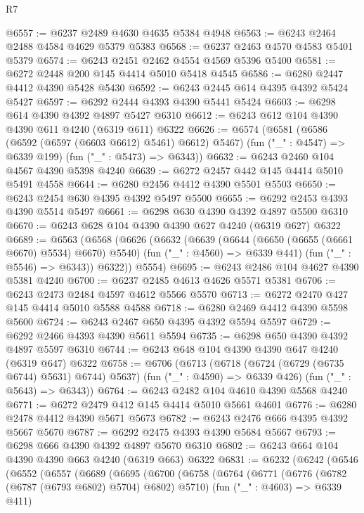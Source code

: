 \begin{lexlean}{R7}
\begin{coremodule}
@6557 := @6237 @2489 @4630 @4635 @5384 @4948
@6563 := @6243 @2464 @2488 @4584 @4629 @5379 @5383
@6568 := @6237 @2463 @4570 @4583 @5401 @5379
@6574 := @6243 @2451 @2462 @4554 @4569 @5396 @5400
@6581 := @6272 @2448 @200 @145 @4414 @5010 @5418 @4545
@6586 := @6280 @2447 @4412 @4390 @5428 @5430
@6592 := @6243 @2445 @614 @4395 @4392 @5424 @5427
@6597 := @6292 @2444 @4393 @4390 @5441 @5424
@6603 := @6298 @614 @4390 @4392 @4897 @5427 @6310
@6612 := @6243 @612 @104 @4390 @4390 @611 @4240 (@6319 @611) @6322
@6626 := @6574
    (@6581
      (@6586 (@6592 (@6597 (@6603 @6612) @5461) @6612) @5467)
      (fun ("_" : @4547) => @6339 @199)
      (fun ("_" : @5473) => @6343))
@6632 := @6243 @2460 @104 @4567 @4390 @5398 @4240
@6639 := @6272 @2457 @442 @145 @4414 @5010 @5491 @4558
@6644 := @6280 @2456 @4412 @4390 @5501 @5503
@6650 := @6243 @2454 @630 @4395 @4392 @5497 @5500
@6655 := @6292 @2453 @4393 @4390 @5514 @5497
@6661 := @6298 @630 @4390 @4392 @4897 @5500 @6310
@6670 := @6243 @628 @104 @4390 @4390 @627 @4240 (@6319 @627) @6322
@6689 := @6563
    (@6568
      (@6626
        (@6632
          (@6639
            (@6644 (@6650 (@6655 (@6661 @6670) @5534) @6670) @5540)
            (fun ("_" : @4560) => @6339 @441)
            (fun ("_" : @5546) => @6343))
          @6322))
      @5554)
@6695 := @6243 @2486 @104 @4627 @4390 @5381 @4240
@6700 := @6237 @2485 @4613 @4626 @5571 @5381
@6706 := @6243 @2473 @2484 @4597 @4612 @5566 @5570
@6713 := @6272 @2470 @427 @145 @4414 @5010 @5588 @4588
@6718 := @6280 @2469 @4412 @4390 @5598 @5600
@6724 := @6243 @2467 @650 @4395 @4392 @5594 @5597
@6729 := @6292 @2466 @4393 @4390 @5611 @5594
@6735 := @6298 @650 @4390 @4392 @4897 @5597 @6310
@6744 := @6243 @648 @104 @4390 @4390 @647 @4240 (@6319 @647) @6322
@6758 := @6706
    (@6713
      (@6718 (@6724 (@6729 (@6735 @6744) @5631) @6744) @5637)
      (fun ("_" : @4590) => @6339 @426)
      (fun ("_" : @5643) => @6343))
@6764 := @6243 @2482 @104 @4610 @4390 @5568 @4240
@6771 := @6272 @2479 @412 @145 @4414 @5010 @5661 @4601
@6776 := @6280 @2478 @4412 @4390 @5671 @5673
@6782 := @6243 @2476 @666 @4395 @4392 @5667 @5670
@6787 := @6292 @2475 @4393 @4390 @5684 @5667
@6793 := @6298 @666 @4390 @4392 @4897 @5670 @6310
@6802 := @6243 @664 @104 @4390 @4390 @663 @4240 (@6319 @663) @6322
@6831 := @6232
    (@6242
      (@6546
        (@6552
          (@6557
            (@6689
              (@6695
                (@6700
                  (@6758
                    (@6764
                      (@6771
                        (@6776 (@6782 (@6787 (@6793 @6802) @5704) @6802) @5710)
                        (fun ("_" : @4603) => @6339 @411)

\end{coremodule}
\end{lexlean}
